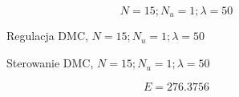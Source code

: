 \begin{equation}
    N = 15; N_u = 1; \lambda = 50
\end{equation}

\begin{figure}[H]
\centering

\caption{Regulacja DMC, $N = 15; N_u = 1; \lambda = 50$}
\end{figure}

\begin{figure}[H]
\centering

\caption{Sterowanie DMC, $N = 15; N_u = 1; \lambda = 50$}
\end{figure}

\begin{equation}
    E = \num{276,3756}
\end{equation}
